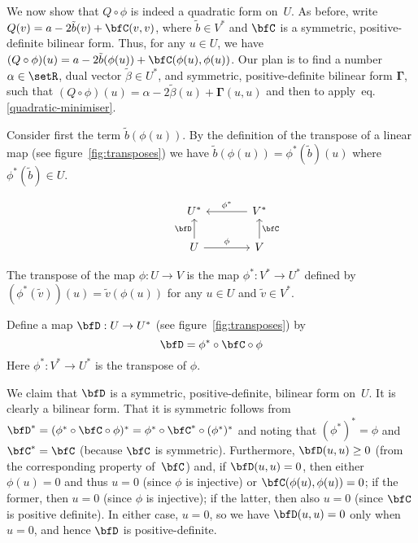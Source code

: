 \documentclass[10pt, a4paper]{article}
\begin{document}
We now show that $Q\circ\phi$ is indeed a quadratic form on~$U$. As before,
write $Q(v)=a -2\tilde{b}(v) + \bfC(v,v)$, where $\tilde{b}\in V^*$ and
$\bfC$ is a symmetric, positive-definite bilinear form. Thus, for any
$u\in U$, we have
$(Q\circ\phi)(u) = a -2\tilde{b}(\phi(u)) + \bfC(\phi(u), \phi(u))$. Our plan is to
find a number $\alpha\in\setR$, dual vector $\tilde{\beta}\in U^*$, and symmetric,
positive-definite bilinear form $\bm{\Gamma}$, such that
$(Q\circ\phi)(u)=\alpha -2\tilde{\beta}(u) + \bm{\Gamma}(u,u)$ and then to
apply~eq.\eqref{quadratic-minimiser}.

Consider first the term $\tilde{b}(\phi(u))$. By the definition of the
transpose of a linear map (see figure~\ref{fig:transposes}) we have
$\tilde{b}(\phi(u))=\phi^*(\tilde{b})(u)$ where $\phi^*(\tilde{b})\in U$.
\begin{marginfigure}
  \[\begin{tikzcd}[column sep=large]
      & U^*  & V^* \arrow[l, "\phi^*"'] \\
      & U \arrow[u, "\bfD"] \arrow[r, "\phi"] & V \arrow[u,
      "\bfC"'] 
    \end{tikzcd}\]
  \caption{The transpose of the map $\phi\colon U\to V$ is the map
    $\phi^*\colon V^*\to U^*$ defined by
    $(\phi^*(\tilde{v}))(u) = \tilde{v}(\phi(u))$ for any $u\in U$ and
    $\tilde{v}\in V^*$. \label{fig:transposes}}
\end{marginfigure} 






Define a map $\bfD:U\to U^*$ (see figure~\ref{fig:transposes})
by
\[
  \bfD = \phi^*\circ \bfC \circ \phi
\]
Here $\phi^*\colon V^*\to U^*$ is the transpose of
$\phi$.

We claim that $\bfD$ is a symmetric, positive-definite, bilinear form
on~$U$. It is clearly a bilinear form. That it is symmetric follows
from
$\bfD^* = (\phi^*\circ \bfC \circ \phi)^* = \phi^*\circ \bfC^* \circ (\phi^*)^*$ and noting that
$(\phi^*)^* = \phi$ and $\bfC^* = \bfC$ (because $\bfC$ is
symmetric). Furthermore, $\bfD(u,u)\geq0$ (from the corresponding
property of~$\bfC$) and, if $\bfD(u,u) = 0$, then either $\phi(u)=0$ and
thus $u=0$ (since $\phi$ is injective) or $\bfC(\phi(u),\phi(u)) = 0$; if the
former, then $u=0$ (since $\phi$ is injective); if the latter, then also
$u=0$ (since $\bfC$ is positive definite). In either case, $u=0$, so
we have $\bfD(u,u)=0$ only when $u=0$, and hence $\bfD$ is
positive-definite.
\end{document}
